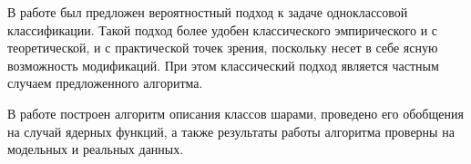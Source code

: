 В работе был предложен вероятностный подход к задаче одноклассовой классификации. Такой подход более удобен классического эмпирического и с теоретической, и с практической точек зрения, поскольку несет в себе ясную возможность модификаций. При этом классический подход является частным случаем предложенного алгоритма.

В работе построен алгоритм описания классов шарами, проведено его обобщения на случай ядерных функций, а также результаты работы алгоритма проверны на модельных и реальных данных.